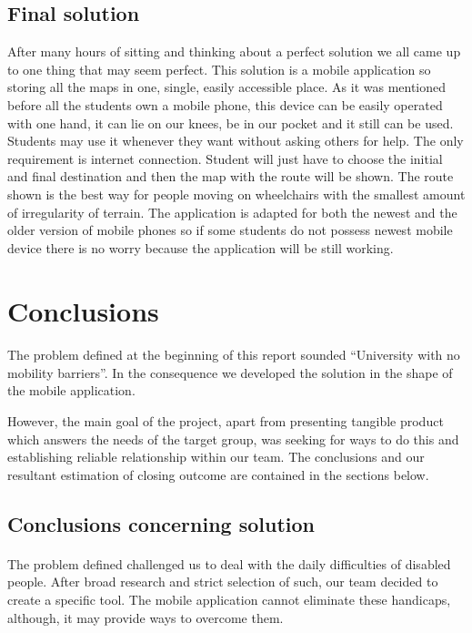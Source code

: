 \documentclass[12pt]{article}
\begin{document}
\subsection{Final solution}
After many hours of sitting and thinking about a perfect solution we all came up to one thing that may seem perfect. This solution is a mobile application so storing all the maps in one, single,  easily accessible place. As it was mentioned before all the students own a mobile phone, this device can be easily operated with one hand, it can lie on our knees, be in our pocket and it still can be used. Students may use it whenever they want without asking others for help. The only requirement is internet connection.  Student will just have to choose the initial and final destination and then the map with the route will be shown. The route shown is the best way for people moving on wheelchairs with the smallest amount of irregularity of terrain. The application is adapted for both the newest and the older version of mobile phones so if some students do not possess newest mobile device there is no worry because the application will be still working. 


\section{Conclusions}
\paragraph{}
The problem defined at the beginning of this report sounded ``University with no mobility barriers''.
In the consequence we developed the solution in the shape of the mobile application.

However, the main goal of the project, apart from presenting tangible product which answers the needs of the target group, was seeking for ways to do this and establishing reliable relationship within our team.
The conclusions and our resultant estimation of closing outcome are contained in the sections below.

\subsection{Conclusions concerning solution}
\paragraph{}
The problem defined challenged us to deal with the daily difficulties of disabled people.
After broad research and strict selection of such, our team decided to create a specific tool.
The mobile application cannot eliminate these handicaps, although, it may provide ways to overcome them.
\end{document}
